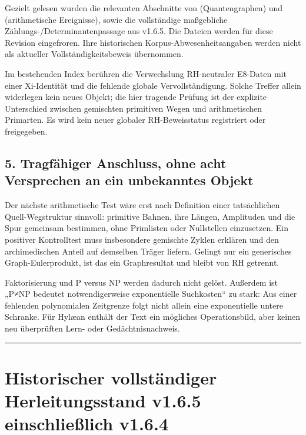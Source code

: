 Gezielt gelesen wurden die relevanten Abschnitte von
 (Quantengraphen) und
 (arithmetische
Ereignisse), sowie die vollständige maßgebliche
Zählungs-/Determinantenpassage aus v1.6.5. Die Dateien werden für diese
Revision eingefroren. Ihre historischen Korpus-Abwesenheitsangaben
werden nicht als aktueller Vollständigkeitsbeweis übernommen.

Im bestehenden Index berühren  die
Verwechslung RH-neutraler E8-Daten mit einer Xi-Identität und
 die
fehlende globale Vervollständigung. Solche Treffer allein widerlegen
kein neues Objekt; die hier tragende Prüfung ist der explizite
Unterschied zwischen gemischten primitiven Wegen und arithmetischen
Primarten. Es wird kein neuer globaler RH-Beweisstatus registriert oder
freigegeben.

\subsection{5. Tragfähiger Anschluss, ohne acht Versprechen an ein
unbekanntes
Objekt}\label{tragfuxe4higer-anschluss-ohne-acht-versprechen-an-ein-unbekanntes-objekt}

Der nächste arithmetische Test wäre erst nach Definition einer
tatsächlichen Quell-Wegstruktur sinnvoll: primitive Bahnen, ihre Längen,
Amplituden und die Spur gemeinsam bestimmen, ohne Primlisten oder
Nullstellen einzusetzen. Ein positiver Kontrolltest muss insbesondere
gemischte Zyklen erklären und den archimedischen Anteil auf demselben
Träger liefern. Gelingt nur ein generisches Graph-Eulerprodukt, ist das
ein Graphresultat und bleibt von RH getrennt.

Faktorisierung und P versus NP werden dadurch nicht gelöst. Außerdem ist
„P≠NP bedeutet notwendigerweise exponentielle Suchkosten`` zu stark: Aus
einer fehlenden polynomialen Zeitgrenze folgt nicht allein eine
exponentielle untere Schranke. Für Hylæan enthält der Text ein mögliches
Operationsbild, aber keinen neu überprüften Lern- oder
Gedächtnisnachweis.

\begin{center}\rule{0.5\linewidth}{0.5pt}\end{center}

\section{Historischer vollständiger Herleitungsstand v1.6.5
einschließlich
v1.6.4}\label{historischer-vollstuxe4ndiger-herleitungsstand-v1.6.5-einschlieuxdflich-v1.6.4}

